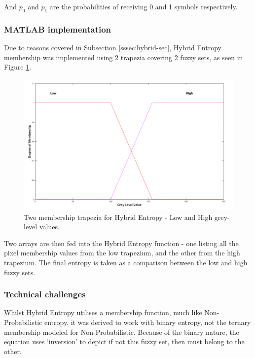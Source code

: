 And $p_0$ and $p_1$ are the probabilities of receiving 0 and 1 symbols respectively.

\subsubsection{MATLAB implementation}

Due to reasons covered in Subsection \ref{sssec:hybrid-sec}, Hybrid Entropy membership was implemented using 2 trapezia covering 2 fuzzy sets, as seen in Figure \ref{fig:2-traps}.

\begin{figure}[H]
  \center
  \includegraphics[scale=0.4]{Chapter2/hybrid-img/2_traps.png}
  \caption{Two membership trapezia for Hybrid Entropy - Low and High grey-level values.}
  \label{fig:2-traps}
\end{figure}

Two arrays are then fed into the Hybrid Entropy function - one listing all the pixel membership values from the low trapezium, and the other from the high trapezium. The final entropy is taken as a comparison between the low and high fuzzy sets.

\subsubsection{Technical challenges}
\label{sssec:hyrid-technical}

Whilst Hybrid Entropy utilises a membership function, much like Non-Probabilistic entropy, it was derived to work with binary entropy, not the ternary membership modeled for Non-Probabilistic. Because of the binary nature, the equation uses `inversion' to depict if not this fuzzy set, then must belong to the other.

